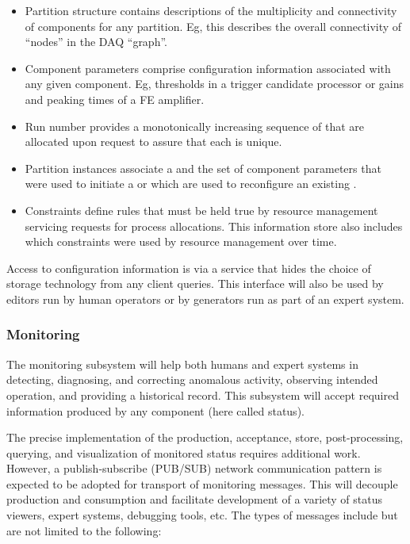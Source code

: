 \begin{itemize}

\item Partition structure contains descriptions of the multiplicity and
  connectivity of  components for any partition. 
  Eg, this describes the overall connectivity of ``nodes'' in the DAQ ``graph''.

\item Component parameters comprise configuration information associated with
  any given  component. 
  Eg, thresholds in a trigger candidate processor or gains and peaking times of
  a FE amplifier.

\item Run number provides a monotonically increasing sequence of
   that are allocated upon request to assure that each is
  unique.

\item Partition instances associate a  and the set of component
  parameters that were used to initiate a  or which are used to
  reconfigure an existing .  

\item Constraints define rules that must be held true by resource management
  servicing requests for process allocations. 
  This information store also includes which constraints were used by resource
  management over time.
\end{itemize}


Access to configuration information is via a service that hides the choice of
storage technology from any client queries.
This interface will also be used by editors run by human operators or by
generators run as part of an expert system.

\subsubsection{Monitoring}
\label{sec:daq:design:ccm:monitoring}

The  monitoring subsystem will help both humans and expert systems in
detecting, diagnosing, and correcting anomalous activity, observing intended
operation, and providing a historical record.
This subsystem will accept required information produced by any 
component (here called status).

The precise implementation of the production, acceptance, store,
post-processing, querying, and visualization of monitored status requires
additional work. 
However, a publish-subscribe (PUB/SUB) network communication pattern is expected
to be adopted for transport of monitoring messages. 
This will decouple production and consumption and facilitate development of a
variety of status viewers, expert systems, debugging tools, etc. 
The types of messages include but are not limited to the following:

